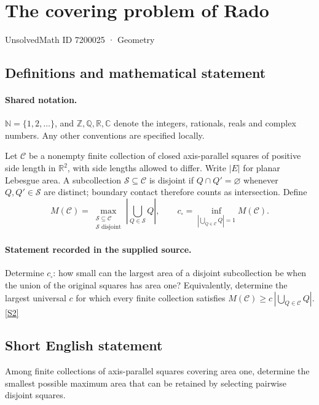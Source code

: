 \documentclass[11pt]{article}
\newcommand{\sref}[2]{\hyperlink{source:#1:#2}{[S#2]}}
\begin{document}
\setcounter{section}{7200024}
\section{The covering problem of Rado}\label{7200025}
{\small\sffamily UnsolvedMath ID 7200025 · Geometry}
\subsection{Definitions and mathematical statement}

\paragraph{Shared notation.}$\mathbb N=\{1,2,\ldots\}$, and $\mathbb Z,\mathbb Q,\mathbb R,\mathbb C$ denote the integers, rationals, reals and complex numbers. Any other conventions are specified locally.


Let $\mathcal C$ be a nonempty finite collection of closed axis-parallel squares of positive side length in $\mathbb R^2$, with side lengths allowed to differ. Write $|E|$ for planar Lebesgue area. A subcollection $\mathcal S\subseteq\mathcal C$ is disjoint if $Q\cap Q'=\varnothing$ whenever $Q,Q'\in\mathcal S$ are distinct; boundary contact therefore counts as intersection. Define
\[M(\mathcal C)=\max_{\substack{\mathcal S\subseteq\mathcal C\\\mathcal S\text{ disjoint}}}\left|\bigcup_{Q\in\mathcal S}Q\right|,\qquad c_\square=\inf_{|\bigcup_{Q\in\mathcal C}Q|=1}M(\mathcal C).\]
\paragraph{Statement recorded in the supplied source.}
Determine $c_\square$: how small can the largest area of a disjoint subcollection be when the union of the original squares has area one? Equivalently, determine the largest universal $c$ for which every finite collection satisfies $M(\mathcal C)\geq c\,|\bigcup_{Q\in\mathcal C}Q|$. \sref{7200025}{2}
\subsection{Short English statement}
Among finite collections of axis-parallel squares covering area one, determine the smallest possible maximum area that can be retained by selecting pairwise disjoint squares.
\end{document}
